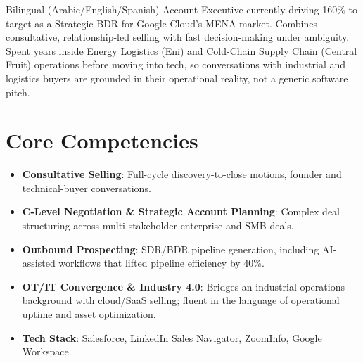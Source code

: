 \documentclass[11pt,a4paper,sans]{moderncv}
\begin{document}
\makecvtitle


\vspace{6pt}
\small{Bilingual (Arabic/English/Spanish) Account Executive currently driving 160\% to target as a Strategic BDR for Google Cloud's MENA market. Combines consultative, relationship-led selling with fast decision-making under ambiguity. Spent years inside Energy Logistics (Eni) and Cold-Chain Supply Chain (Central Fruit) operations before moving into tech, so conversations with industrial and logistics buyers are grounded in their operational reality, not a generic software pitch.}


\section{Core Competencies}
\vspace{1pt}
\begin{itemize}

\item \textbf{Consultative Selling}: Full-cycle discovery-to-close motions, founder and technical-buyer conversations.

\item \textbf{C-Level Negotiation \& Strategic Account Planning}: Complex deal structuring across multi-stakeholder enterprise and SMB deals.

\item \textbf{Outbound Prospecting}: SDR/BDR pipeline generation, including AI-assisted workflows that lifted pipeline efficiency by 40\%.

\item \textbf{OT/IT Convergence \& Industry 4.0}: Bridges an industrial operations background with cloud/SaaS selling; fluent in the language of operational uptime and asset optimization.

\item \textbf{Tech Stack}: Salesforce, LinkedIn Sales Navigator, ZoomInfo, Google Workspace.

\end{itemize}

\end{document}
